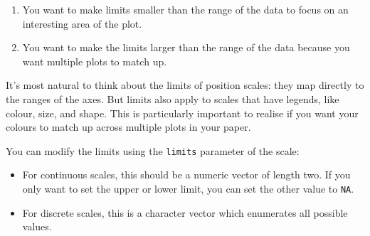 \begin{enumerate}
\def\labelenumi{\arabic{enumi}.}
\item
  You want to make limits smaller than the range of the data to focus on
  an interesting area of the plot.
\item
  You want to make the limits larger than the range of the data because
  you want multiple plots to match up.
\end{enumerate}

It's most natural to think about the limits of position scales: they map
directly to the ranges of the axes. But limits also apply to scales that
have legends, like colour, size, and shape. This is particularly
important to realise if you want your colours to match up across
multiple plots in your paper.

You can modify the limits using the \texttt{limits} parameter of the
scale:

\begin{itemize}
\item
  For continuous scales, this should be a numeric vector of length two.
  If you only want to set the upper or lower limit, you can set the
  other value to \texttt{NA}.
\item
  For discrete scales, this is a character vector which enumerates all
  possible values.
\end{itemize}

\begin{Shaded}
\begin{Highlighting}[]
\StringTok{ }\NormalTok{(} \NormalTok{:}\NormalTok{, } \NormalTok{:}\NormalTok{)}
\StringTok{ }\StringTok{ }\NormalTok{() }

\StringTok{ }\NormalTok{(} \NormalTok{(}\NormalTok{, }\NormalTok{))}
\StringTok{ }\NormalTok{(} \NormalTok{(}\NormalTok{, }\NormalTok{))}
\end{Highlighting}
\end{Shaded}

